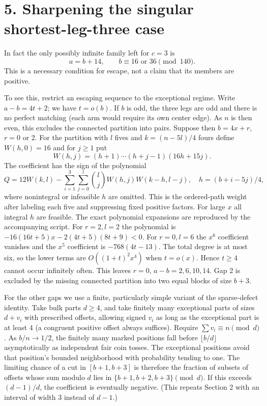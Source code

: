 \documentclass[11pt]{article}
\begin{document}
\section*{5. Sharpening the singular shortest-leg-three
case}\label{sharpening-the-singular-shortest-leg-three-case}

In fact the only possibly infinite family left for \(c=3\) is \[
   a=b+14,\qquad b\equiv16\text{ or }36\pmod{140}.
\] This is a necessary condition for escape, not a claim that its
members are positive.

To see this, restrict an escaping sequence to the exceptional regime.
Write \(a-b=4t+2\); we have \(t=o(b)\). If \(b\) is odd, the three legs
are odd and there is no perfect matching (each arm would require its own
center edge). As \(n\) is then even, this excludes the connected
partition into pairs. Suppose then \(b=4x+r\), \(r=0\) or \(2\). For the
partition with \(l\) fives and \(k=(n-5l)/4\) fours define \(W(h,0)=16\)
and for \(j\ge1\) put \[
 W(h,j)=(h+1)\cdots(h+j-1)(16h+15j).
\] The coefficient has the sign of the polynomial \[
 Q=12W(k,l)-\sum_{i=1}^3\sum_{j=0}^l\binom lj W(h,j)W(k-h,l-j),
 \quad h=(b+i-5j)/4,
\] where nonintegral or infeasible \(h\) are omitted. This is the
ordered-path weight after labeling each five and suppressing fixed
positive factors. For large \(x\) all integral \(h\) are feasible. The
exact polynomial expansions are reproduced by the accompanying script.
For \(r=2,l=2\) the polynomial is \(-16(16t+5)x-2(4t+5)(8t+9)<0\). For
\(r=0,l=6\) the \(x^6\) coefficient vanishes and the \(x^5\) coefficient
is \(-768(4t-13)\). The total degree is at most six, so the lower terms
are \(O((1+t)^2x^4)\) when \(t=o(x)\). Hence \(t\ge4\) cannot occur
infinitely often. This leaves \(r=0\), \(a-b=2,6,10,14\). Gap 2 is
excluded by the missing connected partition into two equal blocks of
size \(b+3\).

For the other gaps we use a finite, particularly simple variant of the
sparse-defect identity. Take bulk parts \(d\ge4\), and take finitely
many exceptional parts of sizes \(d+v_i\) with prescribed offsets,
allowing signed \(v_i\) as long as the exceptional part is at least 4 (a
congruent positive offset always suffices). Require
\(\sum v_i\equiv n\pmod d\). As \(b/n\to1/2\), the finitely many marked
positions fall before \(\lfloor b/d\rfloor\) asymptotically as
independent fair coin tosses. The exceptional positions avoid that
position's bounded neighborhood with probability tending to one. The
limiting chance of a cut in \([b+1,b+3]\) is therefore the fraction of
subsets of offsets whose sum modulo \(d\) lies in
\(\{b+1,b+2,b+3\}\pmod d\). If this exceeds \((d-1)/d\), the coefficient
is eventually negative. (This repeats Section 2 with an interval of
width 3 instead of \(d-1\).)
\end{document}
